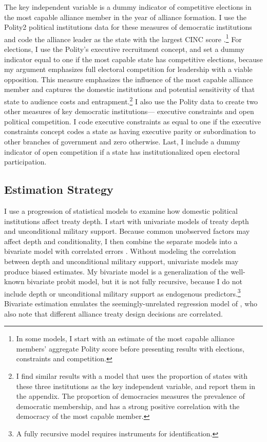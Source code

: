 \documentclass[12pt]{article}
\begin{document}
The key independent variable is a dummy indicator of competitive elections in the most capable alliance member in the year of alliance formation. 
I use the Polity2 political institutions data for these measures of democratic institutions and code the alliance leader as the state with the largest CINC score \citep{SingerCINC1988}.\footnote{In some models, I start with an estimate of the most capable alliance members' aggregate Polity score before presenting results with elections, constraints and competition.}
For elections, I use the Polity's executive recruitment concept, and set a dummy indicator equal to one if the most capable state has competitive elections, because my argument emphasizes full electoral competition for leadership with a viable opposition. 
This measure emphasizes the influence of the most capable alliance member and captures the domestic institutions and potential sensitivity of that state to audience costs and entrapment.\footnote{I find similar results with a model that uses the proportion of states with these three institutions as the key independent variable, and report them in the appendix. The proportion of democracies measures the prevalence of democratic membership, and has a strong positive correlation with the democracy of the most capable member.}    
I also use the Polity data to create two other measures of key democratic institutions--- executive constraints and open political competition.
I code executive constraints as equal to one if the executive constraints concept codes a state as having executive parity or subordination to other branches of government and zero otherwise.
Last, I include a dummy indicator of open competition if a state has institutionalized open electoral participation.  



\subsection{Estimation Strategy}


I use a progression of statistical models to examine how domestic political institutions affect treaty depth. 
I start with univariate models of treaty depth and unconditional military support. 
Because common unobserved factors may affect depth and conditionality, I then combine the separate models into a bivariate model with correlated errors \citep{Braumoelleretal2018}.
Without modeling the correlation between depth and unconditional military support, univariate models may produce biased estimates. 
My bivariate model is a generalization of the well-known bivariate probit model, but it is not fully recursive, because I do not include depth or unconditional military support as endogenous predictors.\footnote{A fully recursive model requires instruments for identification.}  
Bivariate estimation emulates the seemingly-unrelated regression model of \citet{FjelstulReiter2019}, who also note that different alliance treaty design decisions are correlated. 
\end{document}

